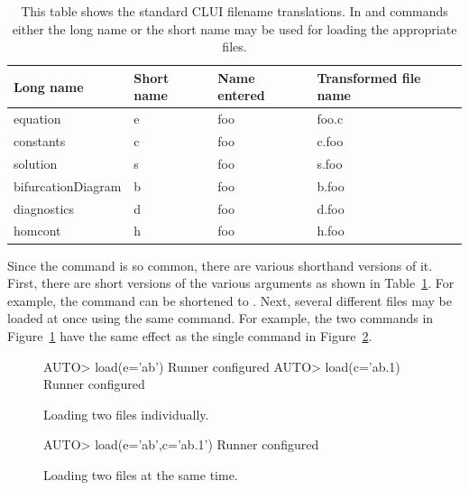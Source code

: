 \documentclass[12pt]{report}
\begin{document}
 \begin{table}[htbp]
 \begin{center}
 \begin{tabular}{| l | l | l | l |}
 \hline
 Long name & Short name & Name entered & Transformed file name \\
 \hline
 equation  & e          & foo          &foo.c \\
 \hline
 constants  & c          & foo          & c.foo \\
 \hline
 solution  & s          & foo          & s.foo \\
 \hline
 bifurcationDiagram  & b          & foo          &b.foo \\
 \hline
 diagnostics  & d          & foo          &d.foo \\
 \hline
 homcont  & h          & foo          &h.foo \\
 \hline
 \end{tabular}
 \caption[Standard \AUTO CLUI filename translations.]
 {This table shows the standard \AUTO CLUI filename
 translations.  In  and 
 commands either the long name or the short name may be
 used for loading the appropriate files.}
 \label{tbl:clui_filename_translation}
 \end{center}
 \end{table}

 Since the  command is so common, there are
 various shorthand versions of it.  First, there are short versions
 of the various arguments as shown in Table~\ref{tbl:clui_filename_translation}.
 For example, the command  can 
 be shortened to .
 Next, several different
 files may be loaded at once using the same  command.
 For example, the two commands in Figure~\ref{exa:clui_two_command}
 have the same effect as the single command in 
 Figure~\ref{exa:clui_one_command}.

 \begin{figure}[htbp]
 {\small \begin{center} \begin{boxedverbatim}
 AUTO> load(e='ab')
 Runner configured
 AUTO> load(c='ab.1)
 Runner configured
 \end{boxedverbatim}
 \end{center} 
 }
 \caption[Loading two files individually]
 {Loading two files individually.}
 \label{exa:clui_two_command}
 \end{figure}

 \begin{figure}[htbp]
 {\small \begin{center} \begin{boxedverbatim}
 AUTO> load(e='ab',c='ab.1')
 Runner configured
 \end{boxedverbatim}
 \end{center} 
 }
 \caption[Loading two files at the same time]
 {Loading two files at the same time.}
 \label{exa:clui_one_command}
 \end{figure}
\end{document}
